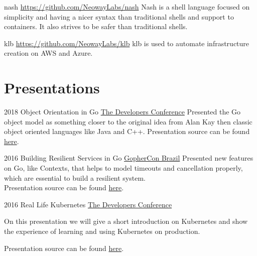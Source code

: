 \documentclass[]{friggeri-cv} %
\begin{document}
\begin{entrylist}
\entry
{}
{nash}
{\href{https://github.com/NeowayLabs/nash}{https://github.com/NeowayLabs/nash}}
{
Nash is a shell language focused on simplicity and having a nicer syntax
than traditional shells and support to containers. It also strives to be
safer than traditional shells.
}
\end{entrylist}

\begin{entrylist}
\entry
{}
{klb}
{\href{https://github.com/NeowayLabs/klb}{https://github.com/NeowayLabs/klb}}
{
klb is used to automate infrastructure creation on AWS and Azure.
}
\end{entrylist}

\section{Presentations}

\begin{entrylist}
\entry
{2018}
{Object Orientation in Go}
{\href{http://www.thedevelopersconference.com.br/tdc/2018/florianopolis/trilha-golang}{The Developers Conference}}
{
Presented the Go object model as something closer to the original
idea from Alan Kay then classic object oriented languages like Java and C++.
Presentation source can be found \href{https://github.com/katcipis/my.presentations/blob/master/gooo/gooo.slide}{here}.
}
\end{entrylist}

\begin{entrylist}
\entry
{2016}
{Building Resilient Services in Go}
{\href{https://2016.gopherconbr.org/en/}{GopherCon Brazil}}
{
Presented new features on Go, like Contexts, that helps to model timeouts and
cancellation properly, which are essential to build a resilient system.\\

Presentation source can be found \href{https://github.com/katcipis/my.presentations/tree/master/resilient-services-in-go}{here}.
}
\end{entrylist}

\begin{entrylist}
\entry
{2016}
{Real Life Kubernetes}
{\href{http://www.thedevelopersconference.com.br/tdc/2016/florianopolis/trilha-devops}{The Developers Conference}}
{
On this presentation we will give a short introduction on Kubernetes and show the experience of learning
and using Kubernetes on production.

Presentation source can be found \href{https://github.com/katcipis/my.presentations/tree/master/real-life-kubernetes}{here}.
}
\end{entrylist}

\end{document}
